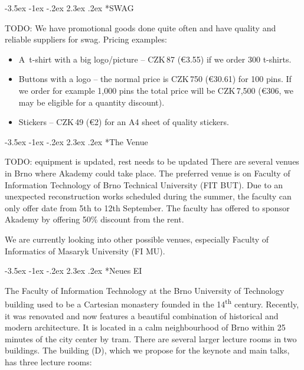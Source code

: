 \documentclass[10pt,a4paper]{article}
\makeatletter
\renewcommand\section{%
\@startsection{section}{1}{\z@}%
              {-3.5ex \@plus -1ex \@minus -.2ex}%
              {2.3ex \@plus.2ex}%
              {\color{kdelight}\sffamily\LARGE\bfseries}}
\makeatother
\begin{document}
\cleardoublepage

\section*{SWAG}
TODO:
We have promotional goods done quite often and have quality and reliable suppliers for swag. Pricing
examples:

\begin{itemize}
\item A~t-shirt with a big logo/picture -- CZK\,87 (\euro{3.55}) if we order 300 t-shirts.
\item Buttons with a logo -- the normal price is CZK\,750 (\euro{30.61}) for 100 pins. If we order for example 
1,000 pins the total price will be CZK\,7,500 (\euro{306}, we may be eligible for a quantity
discount).
\item Stickers -- CZK\,49 (\euro{2}) for an A4 sheet of quality stickers.
\end{itemize}

\cleardoublepage

\section*{The Venue}
TODO: equipment is updated, rest needs to be updated
There are several venues in Brno where Akademy could take place. The preferred venue is on Faculty of Information Technology of Brno Technical University (FIT BUT). Due to an unexpected reconstruction works scheduled during the summer, the faculty can only offer date from 5th to 12th September. The faculty has offered to sponsor Akademy by offering 50\% discount from the rent.

We are currently looking into other possible venues, especially Faculty of Informatics of Masaryk University (FI MU).

\section*{Neues EI}

\begin{figure}
\vspace{-22pt}
\begin{center}
\end{center}
\vspace{-16pt}
\end{figure}
The \mbox{Faculty} of Information Technology at
the Brno University of \mbox{Technology} building used to be a \mbox{Cartesian} monastery founded in the 14\textsuperscript{th}
century. Recently, it was renovated and now features a beautiful combination of historical and modern
architecture. It is located in a calm neighbourhood of Brno within 25 minutes of the city center by tram.
There are several larger lecture rooms in two buildings. The building (D), which we propose for the keynote and main talks, has three lecture rooms:
\end{document}
